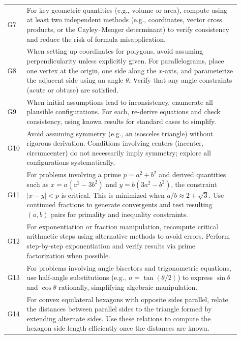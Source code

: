 \documentclass{article}
\theoremstyle{plain}
\theoremstyle{definition}
\theoremstyle{remark}
\begin{document}
\begin{table}[h]
\begin{tabular}{p{0.04\linewidth} p{0.9\linewidth}}
G7 & For key geometric quantities (e.g., volume or area), compute using at least two independent methods (e.g., coordinates, vector cross products, or the Cayley--Menger determinant) to verify consistency and reduce the risk of formula misapplication. \\

G8 & When setting up coordinates for polygons, avoid assuming perpendicularity unless explicitly given. For parallelograms, place one vertex at the origin, one side along the \(x\)-axis, and parameterize the adjacent side using an angle \(\theta\). Verify that any angle constraints (acute or obtuse) are satisfied. \\

G9 & When initial assumptions lead to inconsistency, enumerate all plausible configurations. For each, re-derive equations and check consistency, using known results for standard cases to simplify. \\

G10 & Avoid assuming symmetry (e.g., an isosceles triangle) without rigorous derivation. Conditions involving centers (incenter, circumcenter) do not necessarily imply symmetry; explore all configurations systematically. \\

G11 & For problems involving a prime \(p = a^2 + b^2\) and derived quantities such as \(x = a(a^2 - 3b^2)\) and \(y = b(3a^2 - b^2)\), the constraint \(|x-y| < p\) is critical. This is minimized when \(a/b \approx 2+\sqrt{3}\). Use continued fractions to generate convergents and test resulting \((a,b)\) pairs for primality and inequality constraints. \\

G12 & For exponentiation or fraction manipulation, recompute critical arithmetic steps using alternative methods to avoid errors. Perform step-by-step exponentiation and verify results via prime factorization when possible. \\

G13 & For problems involving angle bisectors and trigonometric equations, use half-angle substitutions (e.g., \(u=\tan(\theta/2)\)) to express \(\sin\theta\) and \(\cos\theta\) rationally, simplifying algebraic manipulation. \\

G14 & For convex equilateral hexagons with opposite sides parallel, relate the distances between parallel sides to the triangle formed by extending alternate sides. Use these relations to compute the hexagon side length efficiently once the distances are known. \\


\end{tabular}
\end{table}
\end{document}
